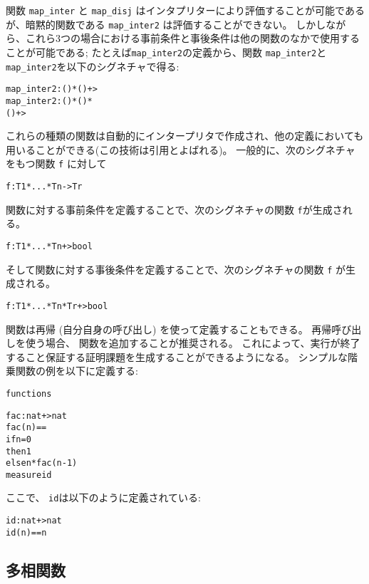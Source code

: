 \documentclass[\pformat,12pt]{jarticle}
\begin{document}
関数 {\tt map\_inter} と {\tt map\_disj} はインタプリターにより評価することが可能であるが、暗黙的関数である {\tt map\_inter2} は評価することができない。
しかしながら、これら3つの場合における事前条件と事後条件は他の関数のなかで使用することが可能である; たとえば\texttt{map\_inter2}の定義から、関数 \texttt{map\_inter2}と \texttt{map\_inter2}を以下のシグネチャで得る:

\begin{alltt}
  map_inter2 : () * () +> 
  map_inter2 : () * () *
                   () +> 
\end{alltt}
これらの種類の関数は自動的にインタープリタで作成され、他の定義においても用いることができる(この技術は引用とよばれる)。
一般的に、次のシグネチャをもつ関数 \texttt{f} に対して
\begin{alltt}
  f : T1 * ... * Tn -> Tr
\end{alltt}
関数に対する事前条件を定義することで、次のシグネチャの関数 \texttt{f}が生成される。
\begin{alltt}
  f : T1 * ... * Tn +> bool
\end{alltt}
そして関数に対する事後条件を定義することで、次のシグネチャの関数 \texttt{f} が生成される。
\begin{alltt}
  f : T1 * ... * Tn * Tr +> bool
\end{alltt}

関数は再帰 (自分自身の呼び出し) を使って定義することもできる。
再帰呼び出しを使う場合、 関数を追加することが推奨される。
これによって、実行が終了すること保証する証明課題を生成することができるようになる。
シンプルな階乗関数の例を以下に定義する:

\begin{alltt}
functions

fac: nat +> nat
fac(n) ==
  if n = 0
  then 1
  else n * fac(n - 1)
measure id
\end{alltt}
ここで、 \texttt{id}は以下のように定義されている:
\begin{alltt}
id: nat +> nat
id(n) == n
\end{alltt}

\subsection{多相関数}
\end{document}
